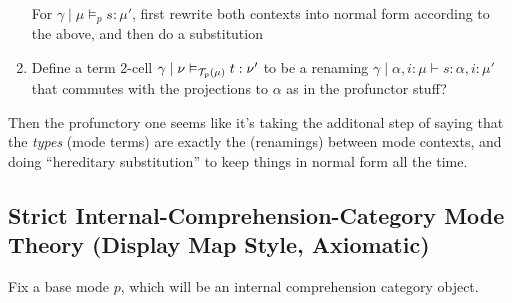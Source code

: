 \documentclass[10pt]{article}
\let\emptyset\varnothing
\newcommand{\yields}{\vdash}
\newcommand\TermTwoT[5]{\ensuremath{#1 \mid #3 \vDash_{#5} #2 : #4}}
\newcommand\TrPlus[2]{\ensuremath{#1^+(#2)}}
\begin{document}
\begin{enumerate}
For $\TermTwoT{\gamma}{s}{\mu}{\mu'}{p}$, first rewrite both contexts
into normal form according to the above, and then do a substitution

\item
Define a term 2-cell $\TermTwoT{\gamma}{t}{\nu}{\nu'}{\El{p}{\mu}}$ to be a
renaming $\gamma \mid \alpha,i:\mu \yields s : \alpha, i:\mu'$
that commutes with the projections to $\alpha$ as in the profunctor stuff?
\end{enumerate}

Then the profunctory one seems like it's taking the additonal step of
saying that the \emph{types} (mode terms) are exactly the 
(renamings) between mode contexts, and doing ``hereditary substitution''
to keep things in normal form all the time.  


\subsection{Strict Internal-Comprehension-Category Mode Theory (Display
  Map Style, Axiomatic)}

\newcommand\wk[0]{\mathsf{w}}
\newcommand\fst[0]{\mathsf{fst}}
\newcommand\snd[0]{\mathsf{snd}}

Fix a base mode $p$, which will be an internal comprehension category
object.    
\end{document}
